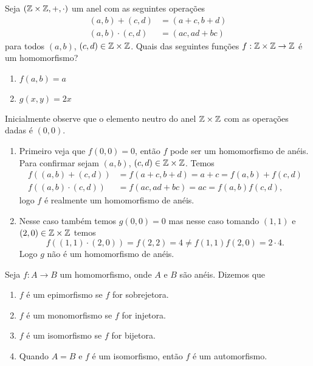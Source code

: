 \begin{exemplo}
    Seja $(\mathbb{Z}\times\mathbb{Z}, +, \cdot)$ um anel com as seguintes opera\c{c}\~oes
    \begin{align*}
        (a, b) + (c, d) &= (a + c, b + d)\\
        (a, b)\cdot (c, d) &= (ac, ad + bc)
    \end{align*}
    para todos $(a, b)$, $(c, d) \in \mathbb{Z}\times\mathbb{Z}$.
    Quais das seguintes funções $f : \mathbb{Z}\times\mathbb{Z} \to \mathbb{Z}$ \'e um homomorfismo?
    \begin{enumerate}[label={\alph*})]
        \item $f(a, b) = a$

        \item $g(x, y) = 2x$
    \end{enumerate}
    \begin{solucao}
        Inicialmente observe que o elemento neutro do anel $\mathbb{Z} \times \mathbb{Z}$ com as operações dadas é $(0, 0)$.
        \begin{enumerate}[label={\alph*})]
            \item Primeiro veja que $f(0, 0) = 0$, então $f$ pode ser um homomorfismo de anéis. Para confirmar sejam $(a, b)$, $(c, d) \in \mathbb{Z} \times \mathbb{Z}$. Temos
                \begin{align*}
                    f((a, b) + (c, d)) &= f(a + c, b + d) = a + c = f(a, b) + f(c, d)\\
                    f((a, b) \cdot (c, d)) &= f(ac, ad + bc) = ac = f(a, b)f(c, d),
                \end{align*}
                logo $f$ é realmente um homomorfismo de anéis.

            \item Nesse caso também temos $g(0, 0) = 0$ mas nesse caso tomando $(1, 1)$ e $(2,0) \in \mathbb{Z} \times \mathbb{Z}$ temos
                \[
                    f((1, 1) \cdot (2, 0)) = f(2, 2) = 4 \ne f(1,1)f(2,0)=2\cdot 4.
                \]
                Logo $g$ não é um homomorfismo de anéis.
        \end{enumerate}
    \end{solucao}
\end{exemplo}


\begin{definicao}Seja $f:A\rightarrow B$ um homomorfismo, onde $A$ e $B$ s{\~a}o an{\'e}is. Dizemos que
    \begin{enumerate}[label={\roman*})]
        \item $f$ {\'e} um epimorfismo se $f$ for sobrejetora.
        \item $f$ {\'e} um monomorfismo se $f$ for injetora.
        \item $f$ {\'e} um isomorfismo se $f$ for bijetora.
        \item Quando $A=B$ e $f$ {\'e} um isomorfismo, ent{\~a}o $f$ {\'e} um automorfismo.
    \end{enumerate}
\end{definicao}

